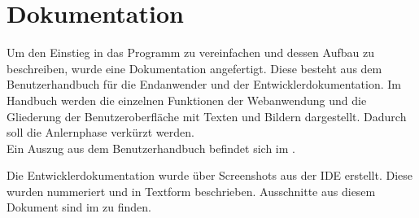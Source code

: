 \section{Dokumentation}
\label{sec:Dokumentation}
Um den Einstieg in das Programm zu vereinfachen und dessen Aufbau zu beschreiben,
wurde eine Dokumentation angefertigt. Diese besteht aus dem Benutzerhandbuch für
die Endanwender und der Entwicklerdokumentation. Im Handbuch werden die einzelnen
Funktionen der Webanwendung und die Gliederung der Benutzeroberfläche mit Texten
und Bildern dargestellt. Dadurch soll die Anlernphase verkürzt werden.\\
Ein Auszug aus dem Benutzerhandbuch befindet sich im .

Die Entwicklerdokumentation wurde über Screenshots aus der \acs{IDE} erstellt.
Diese wurden nummeriert und in Textform beschrieben. Ausschnitte aus diesem
Dokument sind im  zu finden.

